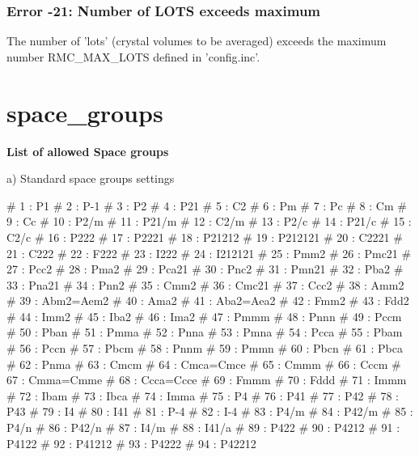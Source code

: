 \subsubsection{Error -21: Number of LOTS exceeds maximum}
\par
The number of 'lots' (crystal volumes to be averaged) exceeds the 
maximum number RMC\_MAX\_LOTS defined in 'config.inc'. 
\section{space\_groups}
{\bf List of allowed Space groups \par }
\par
\vspace{3pt}
a) Standard space groups settings 
\par
\begin{MacVerbatim}
#   1 : P1          #   2 : P-1
#   3 : P2          #   4 : P21         #   5 : C2          #  6 : Pm
#   7 : Pc          #   8 : Cm          #   9 : Cc          #  10 : P2/m
#  11 : P21/m       #  12 : C2/m        #  13 : P2/c        #  14 : P21/c
#  15 : C2/c
#  16 : P222        #  17 : P2221       #  18 : P21212      #  19 : P212121
#  20 : C2221       #  21 : C222        #  22 : F222        #  23 : I222
#  24 : I212121     #  25 : Pmm2        #  26 : Pmc21       #  27 : Pcc2
#  28 : Pma2        #  29 : Pca21       #  30 : Pnc2        #  31 : Pmn21
#  32 : Pba2        #  33 : Pna21       #  34 : Pnn2        #  35 : Cmm2
#  36 : Cmc21       #  37 : Ccc2        #  38 : Amm2        #  39 : Abm2=Aem2
#  40 : Ama2        #  41 : Aba2=Aea2   #  42 : Fmm2        #  43 : Fdd2
#  44 : Imm2        #  45 : Iba2        #  46 : Ima2        #  47 : Pmmm
#  48 : Pnnn        #  49 : Pccm        #  50 : Pban        #  51 : Pmma
#  52 : Pnna        #  53 : Pmna        #  54 : Pcca        #  55 : Pbam
#  56 : Pccn        #  57 : Pbcm        #  58 : Pnnm        #  59 : Pmmn
#  60 : Pbcn        #  61 : Pbca        #  62 : Pnma        #  63 : Cmcm
#  64 : Cmca=Cmce   #  65 : Cmmm        #  66 : Cccm        #  67 : Cmma=Cmme
#  68 : Ccca=Ccce   #  69 : Fmmm        #  70 : Fddd        #  71 : Immm
#  72 : Ibam        #  73 : Ibca        #  74 : Imma
#  75 : P4          #  76 : P41         #  77 : P42         #  78 : P43
#  79 : I4          #  80 : I41         #  81 : P-4         #  82 : I-4
#  83 : P4/m        #  84 : P42/m       #  85 : P4/n        #  86 : P42/n
#  87 : I4/m        #  88 : I41/a       #  89 : P422        #  90 : P4212
#  91 : P4122       #  92 : P41212      #  93 : P4222       #  94 : P42212

\end{MacVerbatim}
